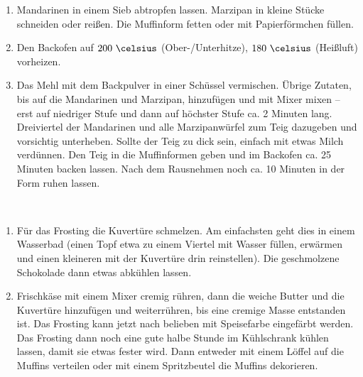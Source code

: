 
\begin{enumerate}
 \item Mandarinen in einem Sieb abtropfen lassen. Marzipan in kleine Stücke schneiden oder reißen. Die Muffinform fetten oder mit Papierförmchen füllen.
 \item Den Backofen auf $200~\celsius$ (Ober-/Unterhitze), $180~\celsius$ (Heißluft) vorheizen.
 \item Das Mehl mit dem Backpulver in einer Schüssel vermischen. Übrige Zutaten, bis auf die Mandarinen und Marzipan, hinzufügen und mit Mixer mixen – erst auf niedriger Stufe und dann auf höchster Stufe ca. 2 Minuten lang. Dreiviertel der Mandarinen und alle Marzipanwürfel zum Teig dazugeben und vorsichtig unterheben. Sollte der Teig zu dick sein, einfach mit etwas Milch verdünnen. Den Teig in die Muffinformen geben und im Backofen ca. 25 Minuten backen lassen. Nach dem Rausnehmen noch ca. 10 Minuten in der Form ruhen lassen.

\end{enumerate}
\hspace{0em}\\
\begin{enumerate}
 \item Für das Frosting die Kuvertüre schmelzen.
 Am einfachsten geht dies in einem Wasserbad (einen Topf etwa zu einem Viertel mit Wasser füllen, erwärmen und einen kleineren mit der Kuvertüre drin reinstellen). 
 Die geschmolzene Schokolade dann etwas abkühlen lassen.
 \item Frischkäse mit einem Mixer cremig rühren, dann die weiche Butter und die Kuvertüre hinzufügen und weiterrühren, bis eine cremige Masse entstanden ist. Das Frosting kann jetzt nach belieben mit Speisefarbe eingefärbt werden.
Das Frosting dann noch eine gute halbe Stunde im Kühlschrank kühlen lassen, damit sie etwas fester wird. Dann entweder mit einem Löffel auf die Muffins verteilen oder mit einem Spritzbeutel die Muffins dekorieren.
\end{enumerate}

